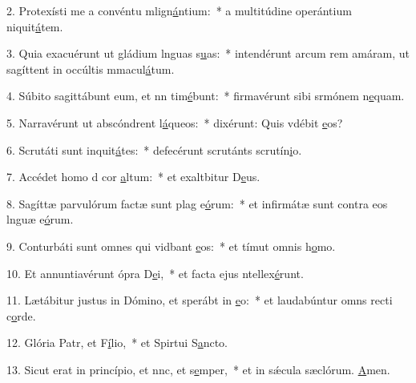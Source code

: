 2. Protexísti me a convéntu mlign\uline{á}ntium:~* a multitúdine operántium niquit\uline{á}tem.\par 
3. Quia exacuérunt ut gládium lnguas s\uline{u}as:~* intendérunt arcum rem amáram, ut sagíttent in occúltis mmacul\uline{á}tum.\par 
4. Súbito sagittábunt eum, et nn tim\uline{é}bunt:~* firmavérunt sibi srmónem n\uline{e}quam.\par 
5. Narravérunt ut abscóndrent l\uline{á}queos:~* dixérunt: Quis vdébit \uline{e}os?\par 
6. Scrutáti sunt inquit\uline{á}tes:~* defecérunt scrutánts scrutín\uline{i}o.\par 
7. Accédet homo d cor \uline{a}ltum:~* et exaltbitur D\uline{e}us.\par 
8. Sagíttæ parvulórum factæ sunt plag e\uline{ó}rum:~* et infirmátæ sunt contra eos lnguæ e\uline{ó}rum.\par 
9. Conturbáti sunt omnes qui vidbant \uline{e}os:~* et tímut omnis h\uline{o}mo.\par 
10. Et annuntiavérunt ópra D\uline{e}i,~* et facta ejus ntellex\uline{é}runt.\par 
11. Lætábitur justus in Dómino, et sperábt in \uline{e}o:~* et laudabúntur omns recti c\uline{o}rde.\par 
12. Glória Patr, et F\uline{í}lio,~* et Spirtui S\uline{a}ncto.\par 
13. Sicut erat in princípio, et nnc, et s\uline{e}mper,~* et in sǽcula sæclórum. \uline{A}men.\par 
